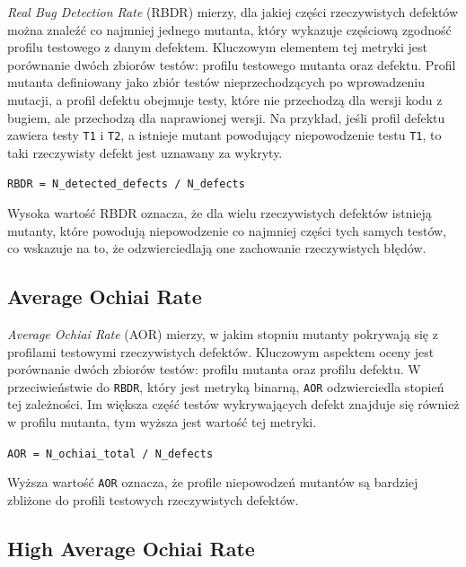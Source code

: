 \documentclass[12pt,a4paper,oldfontcommands]{memoir}
\theoremstyle{plain}
\theoremstyle{definition}
\theoremstyle{remark}
\begin{document}
    \textit{Real Bug Detection Rate} (RBDR) mierzy, dla jakiej części rzeczywistych defektów można znaleźć co najmniej jednego mutanta, który wykazuje częściową zgodność profilu testowego z danym defektem.
    Kluczowym elementem tej metryki jest porównanie dwóch zbiorów testów: profilu testowego mutanta oraz defektu.
    Profil mutanta definiowany jako zbiór testów nieprzechodzących po wprowadzeniu mutacji, a profil defektu obejmuje testy, które nie przechodzą dla wersji kodu z bugiem, ale przechodzą dla naprawionej wersji.
    Na przykład, jeśli profil defektu zawiera testy \texttt{T1} i \texttt{T2}, a istnieje mutant powodujący niepowodzenie testu \texttt{T1}, to taki rzeczywisty defekt jest uznawany za wykryty.

    \begin{center}
        \texttt{RBDR = N\_detected\_defects / N\_defects}
    \end{center}

    Wysoka wartość RBDR oznacza, że dla wielu rzeczywistych defektów istnieją mutanty, które powodują niepowodzenie co najmniej części tych samych testów, co wskazuje na to, że odzwierciedlają one zachowanie rzeczywistych błędów.

    \subsection{Average Ochiai Rate}

    \textit{Average Ochiai Rate} (AOR) mierzy, w jakim stopniu mutanty pokrywają się z profilami testowymi rzeczywistych defektów.
    Kluczowym aspektem oceny jest porównanie dwóch zbiorów testów: profilu mutanta oraz profilu defektu.
    W przeciwieństwie do \texttt{RBDR}, który jest metryką binarną, \texttt{AOR} odzwierciedla stopień tej zależności.
    Im większa część testów wykrywających defekt znajduje się również w profilu mutanta, tym wyższa jest wartość tej metryki.

    \begin{center}
        \texttt{AOR = N\_ochiai\_total / N\_defects}
    \end{center}

    Wyższa wartość \texttt{AOR} oznacza, że profile niepowodzeń mutantów są bardziej zbliżone do profili testowych rzeczywistych defektów.

    \subsection{High Average Ochiai Rate}
\end{document}
